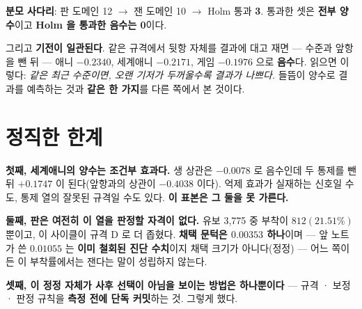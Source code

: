 \documentclass[10pt]{article}
\begin{document}
\textbf{분모 사다리}: 판 도메인 12 $\to$ 잰 도메인 10 $\to$ Holm 통과 \textbf{3}.
통과한 셋은 \textbf{전부 양수}이고 \textbf{Holm 을 통과한 음수는 0}이다.

그리고 \textbf{기전이 일관된다}. 같은 규격에서 뒷항 자체를 결과에 대고 재면 ---
수준과 앞항을 뺀 뒤 --- 애니 $-0.2340$, 세계애니 $-0.2171$, 게임 $-0.1976$ 으로
\textbf{음수}다. 읽으면 이렇다: \emph{같은 최근 수준이면, 오랜 기저가 두꺼울수록
결과가 나쁘다.} 들뜸이 양수로 결과를 예측하는 것과 \textbf{같은 한 가지}를 다른
쪽에서 본 것이다.


\section{정직한 한계}

\textbf{첫째, 세계애니의 양수는 조건부 효과다.} 생 상관은
$-0.0078$ 로 음수인데 두 통제를 뺀 뒤 $+0.1747$ 이 된다(앞항과의 상관이
$-0.4038$ 이다). 억제 효과가 실재하는 신호일 수도, 통제 열의 잘못된 규격일 수도
있다. \textbf{이 표본은 그 둘을 못 가른다.}

\textbf{둘째, 판은 여전히 이 열을 판정할 자격이 없다.} 유보 3{,}775 중 부착이
$812(21.51\%)$ 뿐이고, 이 사이클이 규격 D 로 더 좁혔다. \textbf{채택 문턱은
$0.00353$ 하나}이며 --- 앞 노트가 쓴 $0.01055$ 는 \textbf{이미 철회된 진단
수치}이지 채택 크기가 아니다(정정) --- 어느 쪽이든 이 부착률에서는 잰다는 말이
성립하지 않는다.

\textbf{셋째, 이 정정 자체가 사후 선택이 아님을 보이는 방법은 하나뿐이다} ---
규격 · 보정 · 판정 규칙을 \textbf{측정 전에 단독 커밋}하는 것. 그렇게 했다.
\end{document}
